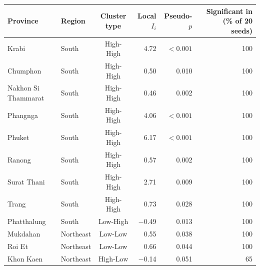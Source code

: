\begin{tabular}{llcrrr}
\toprule
Province & Region & Cluster type & Local $I_i$ & Pseudo-$p$ & Significant in (\% of 20 seeds) \\
\midrule
Krabi & South & High-High & 4.72 & $<0.001$ & 100 \\
Chumphon & South & High-High & 0.50 & 0.010 & 100 \\
Nakhon Si Thammarat & South & High-High & 0.46 & 0.002 & 100 \\
Phangnga & South & High-High & 4.06 & $<0.001$ & 100 \\
Phuket & South & High-High & 6.17 & $<0.001$ & 100 \\
Ranong & South & High-High & 0.57 & 0.002 & 100 \\
Surat Thani & South & High-High & 2.71 & 0.009 & 100 \\
Trang & South & High-High & 0.73 & 0.028 & 100 \\
Phatthalung & South & Low-High & $-$0.49 & 0.013 & 100 \\
Mukdahan & Northeast & Low-Low & 0.55 & 0.038 & 100 \\
Roi Et & Northeast & Low-Low & 0.66 & 0.044 & 100 \\
Khon Kaen & Northeast & High-Low & $-$0.14 & 0.051 & 65 \\
\bottomrule
\end{tabular}
